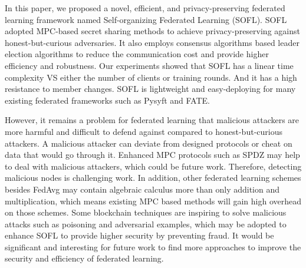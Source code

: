 In this paper, we proposed a novel, efficient, and privacy-preserving federated learning framework named Self-organizing Federated Learning (SOFL). SOFL adopted MPC-based secret sharing methods to achieve privacy-preserving against honest-but-curious adversaries. It also employs consensus algorithms based leader election algorithms to reduce the communication cost and provide higher efficiency and robustness. Our experiments showed that SOFL has a linear time complexity VS either the number of clients or training rounds. And it has a high resistance to member changes. SOFL is lightweight and easy-deploying for many existing federated frameworks such as Pysyft and FATE.

However, it remains a problem for federated learning that malicious attackers are more harmful and difficult to defend against compared to honest-but-curious attackers. A malicious attacker can deviate from designed protocols or cheat on data that would go through it. Enhanced MPC protocols such as SPDZ\cite{SPDZ} may help to deal with malicious attackers, which could be future work. Therefore, detecting malicious nodes is challenging work. In addition, other federated learning schemes besides FedAvg may contain algebraic calculus more than only addition and multiplication, which means existing MPC based methods will gain high overhead on those schemes. Some blockchain techniques are inspiring to solve malicious attacks such as poisoning and adversarial examples, which may be adopted to enhance SOFL to provide higher security by preventing fraud. It would be significant and interesting for future work to find more approaches to improve the security and efficiency of federated learning.